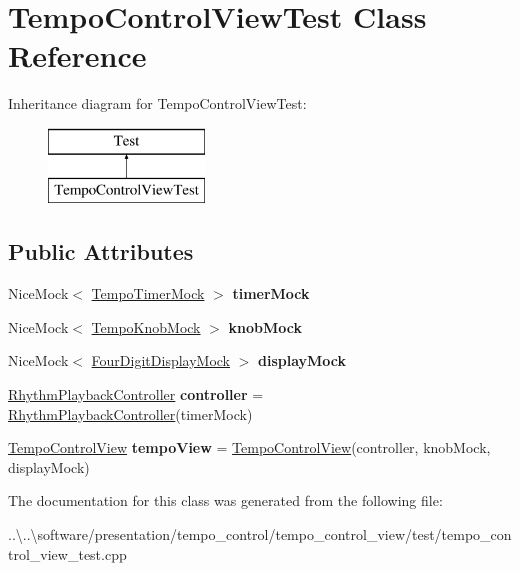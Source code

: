 \hypertarget{class_tempo_control_view_test}{}\section{Tempo\+Control\+View\+Test Class Reference}
\label{class_tempo_control_view_test}
Inheritance diagram for Tempo\+Control\+View\+Test\+:\begin{figure}[H]
\begin{center}
\leavevmode
\includegraphics[height=2.000000cm]{class_tempo_control_view_test}
\end{center}
\end{figure}
\subsection*{Public Attributes}
\begin{DoxyCompactItemize}
\item 
\mbox{\label{class_tempo_control_view_test_a050771720c01d6c11b704d9ad1cff01f}} 
Nice\+Mock$<$ \mbox{\hyperlink{class_tempo_timer_mock}{Tempo\+Timer\+Mock}} $>$ {\bfseries timer\+Mock}
\item 
\mbox{\label{class_tempo_control_view_test_aecfb3b3851d950e21d396c3e4cee47e7}} 
Nice\+Mock$<$ \mbox{\hyperlink{class_tempo_knob_mock}{Tempo\+Knob\+Mock}} $>$ {\bfseries knob\+Mock}
\item 
\mbox{\label{class_tempo_control_view_test_a6af0815cecb1529f78391d9b9cb9dd3d}} 
Nice\+Mock$<$ \mbox{\hyperlink{class_four_digit_display_mock}{Four\+Digit\+Display\+Mock}} $>$ {\bfseries display\+Mock}
\item 
\mbox{\label{class_tempo_control_view_test_aa30375b51fa125e46732b2c16a8c0b6d}} 
\mbox{\hyperlink{class_rhythm_playback_controller}{Rhythm\+Playback\+Controller}} {\bfseries controller} = \mbox{\hyperlink{class_rhythm_playback_controller}{Rhythm\+Playback\+Controller}}(timer\+Mock)
\item 
\mbox{\label{class_tempo_control_view_test_abfb369b29db3a42dca9ef54c4a742714}} 
\mbox{\hyperlink{class_tempo_control_view}{Tempo\+Control\+View}} {\bfseries tempo\+View} = \mbox{\hyperlink{class_tempo_control_view}{Tempo\+Control\+View}}(controller, knob\+Mock, display\+Mock)
\end{DoxyCompactItemize}


The documentation for this class was generated from the following file\+:\begin{DoxyCompactItemize}
\item 
..\textbackslash{}..\textbackslash{}software/presentation/tempo\+\_\+control/tempo\+\_\+control\+\_\+view/test/tempo\+\_\+control\+\_\+view\+\_\+test.\+cpp\end{DoxyCompactItemize}
